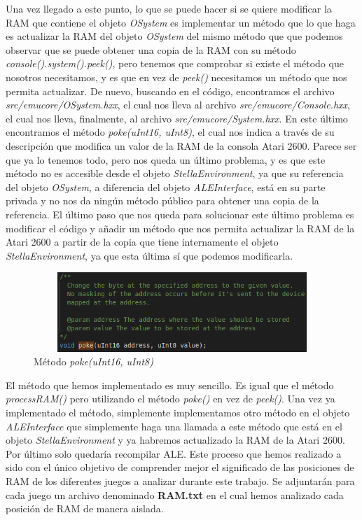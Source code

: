 Una vez llegado a este punto, lo que se puede hacer si se quiere modificar la RAM que contiene el objeto \textit{OSystem} es implementar un método que lo que haga es actualizar la RAM del objeto \textit{OSystem} del mismo método que que podemos observar que se puede obtener una copia de la RAM con su método \textit{console().system().peek()}, pero tenemos que comprobar si existe el método que nosotros necesitamos, y es que en vez de \textit{peek()} necesitamos un método que nos permita actualizar. De nuevo, buscando en el código, encontramos el archivo \textit{src/emucore/OSystem.hxx}, el cual nos lleva al archivo \textit{src/emucore/Console.hxx}, el cual nos lleva, finalmente, al archivo \textit{src/emucore/System.hxx}. En este último encontramos el método \textit{poke(uInt16, uInt8)}, el cual nos indica a través de su descripción que modifica un valor de la RAM de la consola Atari 2600. Parece ser que ya lo tenemos todo, pero nos queda un último problema, y es que este método no es accesible desde el objeto \textit{StellaEnvironment}, ya que su referencia del objeto \textit{OSystem}, a diferencia del objeto \textit{ALEInterface}, está en su parte privada y no nos da ningún método público para obtener una copia de la referencia. El último paso que nos queda para solucionar este último problema es modificar el código y añadir un método que nos permita actualizar la RAM de la Atari 2600 a partir de la copia que tiene internamente el objeto \textit{StellaEnvironment}, ya que esta última sí que podemos modificarla.

\begin{figure}[h]
	\centering
	\includegraphics[width=1\textwidth,height=30mm]{Figures/pokeMethod}
	\caption{Método \textit{poke(uInt16, uInt8)}}
	\label{fig:pokeMethod}
\end{figure}

El método que hemos implementado es muy sencillo. Es igual que el método \textit{processRAM()} pero utilizando el método \textit{poke()} en vez de \textit{peek()}. Una vez ya implementado el método, simplemente implementamos otro método en el objeto \textit{ALEInterface} que simplemente haga una llamada a este método que está en el objeto \textit{StellaEnvironment} y ya habremos actualizado la RAM de la Atari 2600. Por último solo quedaría recompilar ALE. Este proceso que hemos realizado a sido con el único objetivo de comprender mejor el significado de las posiciones de RAM de los diferentes juegos a analizar durante este trabajo. Se adjuntarán para cada juego un archivo denominado \textbf{RAM.txt} en el cual hemos analizado cada posición de RAM de manera aislada.

